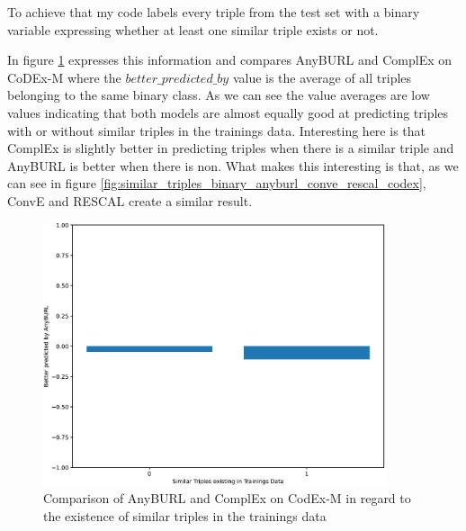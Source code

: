 To achieve that my code labels every triple from the test set with a binary variable expressing whether at least one similar triple exists or not. 

In figure \ref{fig:similar_triples_binary_anyburl_complex_codex} expresses this information and compares AnyBURL and ComplEx on CoDEx-M where the $better\_predicted\_by$ value is the average of all triples belonging to the same binary class. As we can see the value averages are low values indicating that both models are almost equally good at predicting triples with or without similar triples in the trainings data. Interesting here is that ComplEx is slightly better in predicting triples when there is a similar triple and AnyBURL is better when there is non. What makes this interesting is that, as we can see in figure \ref{fig:similar_triples_binary_anyburl_conve_rescal_codex}, ConvE and RESCAL create a similar result. 

\begin{figure}[H]
\centering
\includegraphics[width=0.9\textwidth]{images/similar_triples_binary_anyburl_complex_codex.PNG}
\caption{Comparison of AnyBURL and ComplEx on CodEx-M in regard to the existence of similar triples in the trainings data}
\label{fig:similar_triples_binary_anyburl_complex_codex}
\end{figure}

